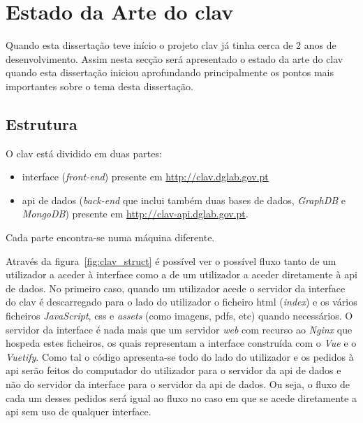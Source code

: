\section{Estado da Arte do \acrshort{clav}}

Quando esta dissertação teve início o projeto \acrshort{clav} já tinha cerca de 2 anos de desenvolvimento. Assim nesta secção será apresentado o estado da arte do \acrshort{clav} quando esta dissertação iniciou aprofundando principalmente os pontos mais importantes sobre o tema desta dissertação.

\subsection{Estrutura}
O \acrshort{clav} está dividido em duas partes:
\begin{itemize}
    \item interface (\textit{front-end}) presente em \url{http://clav.dglab.gov.pt}
    \item \acrshort{api} de dados (\textit{back-end} que inclui também duas bases de dados, \textit{GraphDB} e \textit{MongoDB}) presente em \url{http://clav-api.dglab.gov.pt}.
\end{itemize}

Cada parte encontra-se numa máquina diferente.

Através da figura~\ref{fig:clav_struct} é possível ver o possível fluxo tanto de um utilizador a aceder à interface como a de um utilizador a aceder diretamente à \acrshort{api} de dados. No primeiro caso, quando um utilizador acede o servidor da interface do \acrshort{clav} é descarregado para o lado do utilizador o ficheiro \acrshort{html} (\textit{index}) e os vários ficheiros \textit{JavaScript}, \acrshort{css} e \textit{assets} (como imagens, \acrshort{pdf}s, etc) quando necessários. O servidor da interface é nada mais que um servidor \textit{web} com recurso ao \textit{Nginx} que hospeda estes ficheiros, os quais representam a interface construída com o \textit{Vue} e o \textit{Vuetify}. Como tal o código apresenta-se todo do lado do utilizador e os pedidos à \acrshort{api} serão feitos do computador do utilizador para o servidor da \acrshort{api} de dados e não do servidor da interface para o servidor da \acrshort{api} de dados. Ou seja, o fluxo de cada um desses pedidos será igual ao fluxo no caso em que se acede diretamente a \acrshort{api} sem uso de qualquer interface.

